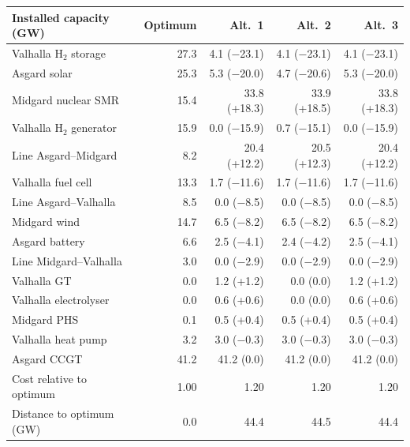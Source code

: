 \begin{tabular}{lrrrr}
\toprule
\textbf{Installed capacity (GW)} & \textbf{Optimum} & \textbf{Alt.~1} & \textbf{Alt.~2} & \textbf{Alt.~3}\\
\midrule
Valhalla H$_2$ storage & 27.3 & 4.1 ($-$23.1) & 4.1 ($-$23.1) & 4.1 ($-$23.1)\\
Asgard solar & 25.3 & 5.3 ($-$20.0) & 4.7 ($-$20.6) & 5.3 ($-$20.0)\\
Midgard nuclear SMR & 15.4 & 33.8 (+18.3) & 33.9 (+18.5) & 33.8 (+18.3)\\
Valhalla H$_2$ generator & 15.9 & 0.0 ($-$15.9) & 0.7 ($-$15.1) & 0.0 ($-$15.9)\\
Line Asgard–Midgard & 8.2 & 20.4 (+12.2) & 20.5 (+12.3) & 20.4 (+12.2)\\
Valhalla fuel cell & 13.3 & 1.7 ($-$11.6) & 1.7 ($-$11.6) & 1.7 ($-$11.6)\\
Line Asgard–Valhalla & 8.5 & 0.0 ($-$8.5) & 0.0 ($-$8.5) & 0.0 ($-$8.5)\\
Midgard wind & 14.7 & 6.5 ($-$8.2) & 6.5 ($-$8.2) & 6.5 ($-$8.2)\\
Asgard battery & 6.6 & 2.5 ($-$4.1) & 2.4 ($-$4.2) & 2.5 ($-$4.1)\\
Line Midgard–Valhalla & 3.0 & 0.0 ($-$2.9) & 0.0 ($-$2.9) & 0.0 ($-$2.9)\\
Valhalla GT & 0.0 & 1.2 (+1.2) & 0.0 (0.0) & 1.2 (+1.2)\\
Valhalla electrolyser & 0.0 & 0.6 (+0.6) & 0.0 (0.0) & 0.6 (+0.6)\\
Midgard PHS & 0.1 & 0.5 (+0.4) & 0.5 (+0.4) & 0.5 (+0.4)\\
Valhalla heat pump & 3.2 & 3.0 ($-$0.3) & 3.0 ($-$0.3) & 3.0 ($-$0.3)\\
Asgard CCGT & 41.2 & 41.2 (0.0) & 41.2 (0.0) & 41.2 (0.0)\\
\midrule
Cost relative to optimum & 1.00 & 1.20 & 1.20 & 1.20\\
Distance to optimum (GW) & 0.0 & 44.4 & 44.5 & 44.4\\
\bottomrule
\end{tabular}

